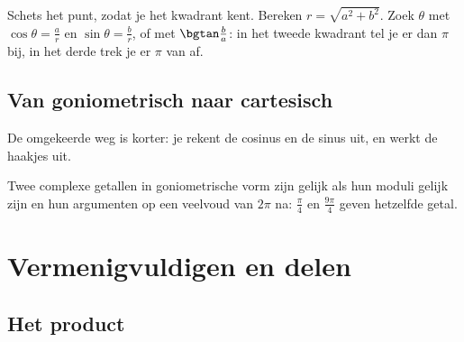 \begin{werkwijze}
Schets het punt, zodat je het kwadrant kent. Bereken $r = \sqrt{a^2 + b^2}$. Zoek $\theta$ met $\cos\theta = \frac{a}{r}$ en $\sin\theta = \frac{b}{r}$, of met $\bgtan\frac{b}{a}$: in het tweede kwadrant tel je er dan $\pi$ bij, in het derde trek je er $\pi$ van af.
\end{werkwijze}


\begin{oefeningen}

\end{oefeningen}

\subsection{Van goniometrisch naar cartesisch}

De omgekeerde weg is korter: je rekent de cosinus en de sinus uit, en werkt de haakjes uit.


Twee complexe getallen in goniometrische vorm zijn gelijk als hun moduli gelijk zijn en hun argumenten op een veelvoud van $2\pi$ na: $\frac{\pi}{4}$ en $\frac{9\pi}{4}$ geven hetzelfde getal.

\begin{oefeningen}
\end{oefeningen}

\section{Vermenigvuldigen en delen}

\subsection{Het product}

